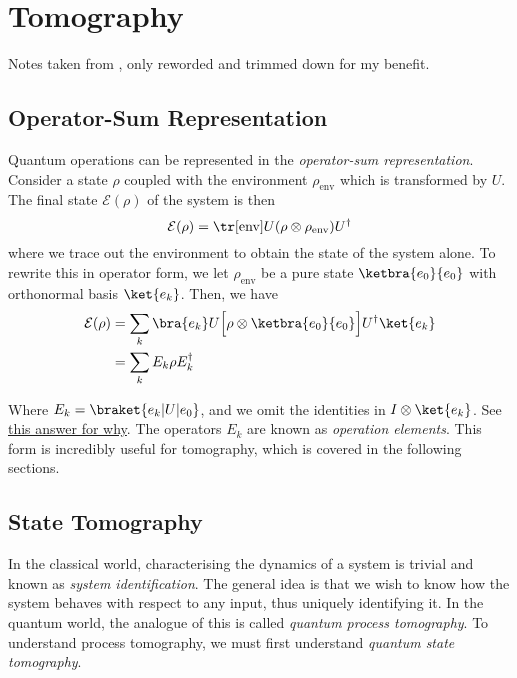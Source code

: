 \section{Tomography}

Notes taken from \cite{nielsen_quantum_2011}, only reworded and trimmed down for my benefit.

\subsection{Operator-Sum Representation} %

Quantum operations can be represented in the \textit{operator-sum representation}. Consider a state
$\rho$ coupled with the environment $\rho_{\text{env}}$ which is transformed by $U$. The final state
$\mathcal{E}(\rho)$ of the system is then
\begin{equation}
    \mathcal{E}(\rho) = \tr[\text{env}]{U (\rho \otimes \rho_{\text{env}}) U^{\dagger}}
\end{equation}
where we trace out the environment to obtain the state of the system alone. To rewrite this in
operator form, we let $\rho_\text{env}$ be a pure state $\ketbra{e_0}{e_0}$ with orthonormal basis
$\ket{e_k}$. Then, we have
\begin{align}
    \mathcal{E}(\rho) &= \sum_k \bra{e_k} U \Big[\rho \otimes \ketbra{e_0}{e_0}\Big] U^{\dagger} \ket{e_k} \\
                      &= \sum_k E_k \rho E_k^{\dagger}
\end{align}

Where $E_k = \braket{e_k | U | e_0}$, and we omit the identities in $I \otimes \ket{e_k}$. See
\href{https://physics.stackexchange.com/questions/276053/trouble-with-operator-sum-representation-of-a-quantum-operation}{this
answer for why}. The operators $E_k$ are known as \textit{operation elements}. This form is
incredibly useful for tomography, which is covered in the following sections. 

\subsection{State Tomography}

In the classical world, characterising the dynamics of a system is trivial and known as
\textit{system identification}. The general idea is that we wish to know how the system behaves with
respect to any input, thus uniquely identifying it. In the quantum world, the analogue of this is
called \textit{quantum process tomography}. To understand process tomography, we must first
understand \textit{quantum state tomography}.

